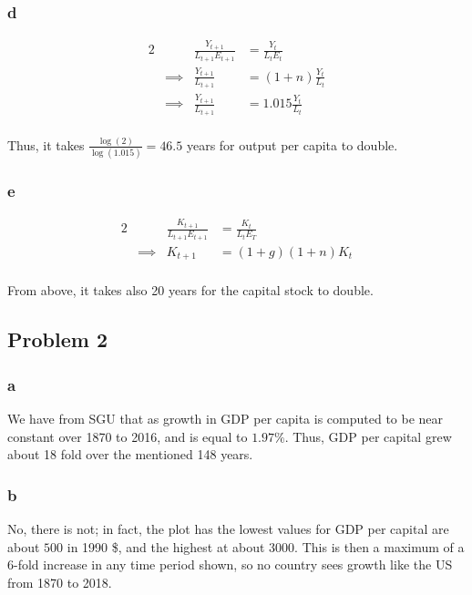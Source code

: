 \documentclass[12pt,letterpaper]{article}
\theoremstyle{definition}
\begin{document}
\subsubsection*{d}

\begin{alignat*}{2}
  && \frac{Y_{t+1}}{L_{t+1}E_{t+1}} &=  \frac{Y_{t}}{L_tE_t} \\
  &\implies& \frac{Y_{t+1}}{L_{t+1}} &= (1 + n)\frac{Y_t}{L_t} \\
  &\implies& \frac{Y_{t+1}}{L_{t+1}} &= 1.015\frac{Y_t}{L_t} \\
\end{alignat*}

Thus, it takes $\frac{\log(2)}{\log(1.015)} = 46.5$ years for output per capita to double.

\subsubsection*{e}

\begin{alignat*}{2}
  && \frac{K_{t+1}}{L_{t+1}E_{t+1}} &= \frac{K_t}{L_tE_T} \\
  &\implies& K_{t+1} &= (1 + g)(1 + n)K_t \\
\end{alignat*}

From above, it takes also 20 years for the capital stock to double.

\subsection*{Problem 2}


\subsubsection*{a}

We have from SGU that as growth in GDP per capita is computed to be near
constant over 1870 to 2016, and is equal to $1.97 \%$. Thus, GDP per capital
grew about 18 fold over the mentioned 148 years.

\subsubsection*{b}

No, there is not; in fact, the plot has the lowest values for GDP per capital
are about $500$ in 1990 \$, and the highest at about $3000$. This is then a
maximum of a 6-fold increase in any time period shown, so no country sees growth
like the US from 1870 to 2018.
\end{document}
